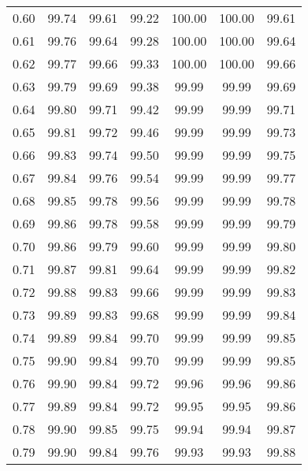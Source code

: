 \begin{tabular}{|c|c|c|c|c|c|c|}
      0.60 &     99.74 &     99.61 &      99.22 &  100.00 &     100.00 &         99.61 \\
      0.61 &     99.76 &     99.64 &      99.28 &  100.00 &     100.00 &         99.64 \\
      0.62 &     99.77 &     99.66 &      99.33 &  100.00 &     100.00 &         99.66 \\
      0.63 &     99.79 &     99.69 &      99.38 &   99.99 &      99.99 &         99.69 \\
      0.64 &     99.80 &     99.71 &      99.42 &   99.99 &      99.99 &         99.71 \\
      0.65 &     99.81 &     99.72 &      99.46 &   99.99 &      99.99 &         99.73 \\
      0.66 &     99.83 &     99.74 &      99.50 &   99.99 &      99.99 &         99.75 \\
      0.67 &     99.84 &     99.76 &      99.54 &   99.99 &      99.99 &         99.77 \\
      0.68 &     99.85 &     99.78 &      99.56 &   99.99 &      99.99 &         99.78 \\
      0.69 &     99.86 &     99.78 &      99.58 &   99.99 &      99.99 &         99.79 \\
      0.70 &     99.86 &     99.79 &      99.60 &   99.99 &      99.99 &         99.80 \\
      0.71 &     99.87 &     99.81 &      99.64 &   99.99 &      99.99 &         99.82 \\
      0.72 &     99.88 &     99.83 &      99.66 &   99.99 &      99.99 &         99.83 \\
      0.73 &     99.89 &     99.83 &      99.68 &   99.99 &      99.99 &         99.84 \\
      0.74 &     99.89 &     99.84 &      99.70 &   99.99 &      99.99 &         99.85 \\
      0.75 &     99.90 &     99.84 &      99.70 &   99.99 &      99.99 &         99.85 \\
      0.76 &     99.90 &     99.84 &      99.72 &   99.96 &      99.96 &         99.86 \\
      0.77 &     99.89 &     99.84 &      99.72 &   99.95 &      99.95 &         99.86 \\
      0.78 &     99.90 &     99.85 &      99.75 &   99.94 &      99.94 &         99.87 \\
      0.79 &     99.90 &     99.84 &      99.76 &   99.93 &      99.93 &         99.88 \\

\end{tabular}
